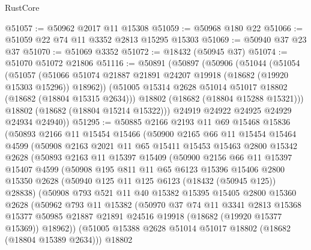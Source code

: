 \begin{lexlean}{RustCore}
\begin{coremodule}
@51057 := @50962 @2017 @11 @15308
@51059 := @50968 @180 @22
@51066 := @51059 @22 @74 @11 @3352 @2813 @15295 @15303
@51069 := @50940 @37 @23 @37
@51070 := @51069 @3352
@51072 := @18432 (@50945 @37)
@51074 := @51070 @51072 @21806
@51116 := @50891
    (@50897
      (@50906
        (@51044
          (@51054
            (@51057
              (@51066 @51074 @21887 @21891 @24207 @19918 (@18682 (@19920 @15303 @15296)) @18962))
            (@51005 @15314 @2628 @51014 @51017 @18802 (@18682 (@18804 @15315 @2634)))
            @18802
            (@18682 (@18804 @15288 @15321)))
          @18802
          (@18682 (@18804 @15214 @15322)))
        @24919
        @24922
        @24925
        @24929
        @24934
        @24940))
@51295 := @50885
    @2166
    @2193
    @11
    @69
    @15468
    @15836
    (@50893
      @2166
      @11
      @15454
      @15466
      (@50900
        @2165
        @66
        @11
        @15454
        @15464
        @4599
        (@50908
          @2163
          @2021
          @11
          @65
          @15411
          @15453
          @15463
          @2800
          @15342
          @2628
          (@50893
            @2163
            @11
            @15397
            @15409
            (@50900
              @2156
              @66
              @11
              @15397
              @15407
              @4599
              (@50908
                @195
                @811
                @11
                @65
                @6123
                @15396
                @15406
                @2800
                @15350
                @2628
                (@50940 @125 @11 @125 @6123 (@18432 (@50945 @125)) @28838)
                (@50908
                  @793
                  @521
                  @11
                  @40
                  @15382
                  @15395
                  @15405
                  @2800
                  @15360
                  @2628
                  (@50962
                    @793
                    @11
                    @15382
                    (@50970
                      @37
                      @74
                      @11
                      @3341
                      @2813
                      @15368
                      @15377
                      @50985
                      @21887
                      @21891
                      @24516
                      @19918
                      (@18682 (@19920 @15377 @15369))
                      @18962))
                  (@51005 @15388 @2628 @51014 @51017 @18802 (@18682 (@18804 @15389 @2634)))
                  @18802

\end{coremodule}
\end{lexlean}
